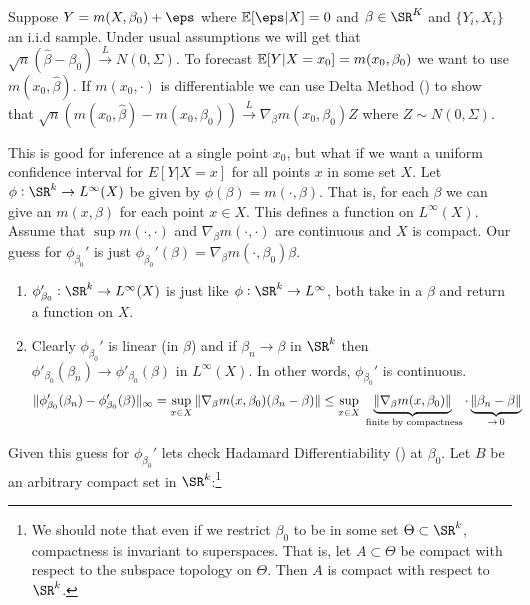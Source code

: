 \begin{example}
	\label{ex:semi-parametric-delta-method}
	Suppose  \(Y=m(X,\beta_0)+\eps\) where \(\E[\eps|X]=0\) and \(\beta\in\SR^K\) and \(\{Y_i,X_i\}\) an i.i.d sample. Under usual assumptions we will get that  \(\sqrt{n}(\widehat\beta-\beta_0)\overset{L}{\to}N(0,\Sigma)\). To forecast \(\mathbb{E}[Y|X=x_0]=m(x_0,\beta_0)\) we want to use \(m(x_0,\widehat\beta)\). If \(m(x_0,\cdot)\) is differentiable we can use Delta Method () to show that \(\sqrt{n}(m(x_0,\widehat\beta)-m(x_0,\beta_0))\overset{L}{\to}\nabla_\beta m(x_0,\beta_0) Z\) where \(Z\sim N(0,\Sigma)\).

	This is good for inference at a single point \(x_0\), but what if we want a uniform confidence interval for \(E[Y|X=x]\) for all points  \(x\) in some set \(X\). Let  \(\phi:\SR^k\to L^\infty(X)\) be given by \(\phi(\beta)=m(\cdot,\beta)\). That is, for each  \(\beta\) we can give an  \(m(x,\beta)\) for each point  \(x\in X\). This defines a function on  \(L^\infty(X)\). Assume that  \(\sup m(\cdot, \cdot)\) and  \(\nabla_\beta m(\cdot,\cdot)\) are continuous and  \(X\) is compact. Our guess for  \(\phi_{\beta_0}'\) is just  \(\phi_{\beta_0}'(\beta) =\nabla_\beta m(\cdot,\beta_0)\beta\). 
	\begin{enumerate}
		\item \(\phi_{\beta_0}':\SR^k\to L^\infty(X)\) is just like \(\phi:\SR^k\to L^{\infty}\), both take in a \(\beta\) and return a function on  \(X\). 
		\item Clearly  \(\phi_{\beta_0}'\) is linear  (in  \(\beta\)) and if  \(\beta_n\to\beta\) in  \(\SR^k\) then \(\phi'_{\beta_0}(\beta_n)\to \phi'_{\beta_0}(\beta)\) in  \(L^\infty(X)\). In other words, \(\phi_{\beta_0}'\) is continuous.
		\begin{align*}
			\|\phi'_{\beta_0}(\beta_n)-\phi_{\beta_0}'(\beta)\|_\infty 
			&= \sup_{x\in X} \|\nabla_\beta m(x,\beta_0)(\beta_n-\beta)\| \leq \sup_{x\in X}\underbrace{\|\nabla_\beta m(x,\beta_0)\|}_{\text{ finite by compactness}}\cdot  \underbrace{\vphantom{\nabla_\beta}\|\beta_n-\beta\|}_{\to\, 0}
		\end{align*}
	\end{enumerate}
	Given this guess for \(\phi_{\beta_0}'\) lets check Hadamard Differentiability () at \(\beta_0\). Let \(B\) be an arbitrary compact set in  \(\SR^k\):\footnote{We should note that even if we restrict \(\beta_0\) to be in some set \(\Theta \subset \SR^k\), compactness is invariant to superspaces. That is, let \(A \subset \Theta\) be compact with respect to the subspace topology on \(\Theta\). Then \(A\) is compact with respect to \(\SR^k\).}

\end{example}
